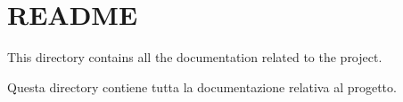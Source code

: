 \chapter{README}
\hypertarget{md_docs_2_r_e_a_d_m_e}{}\label{md_docs_2_r_e_a_d_m_e}

\begin{DoxyItemize}
\item This directory contains all the documentation related to the project.
\item Questa directory contiene tutta la documentazione relativa al progetto. 
\end{DoxyItemize}